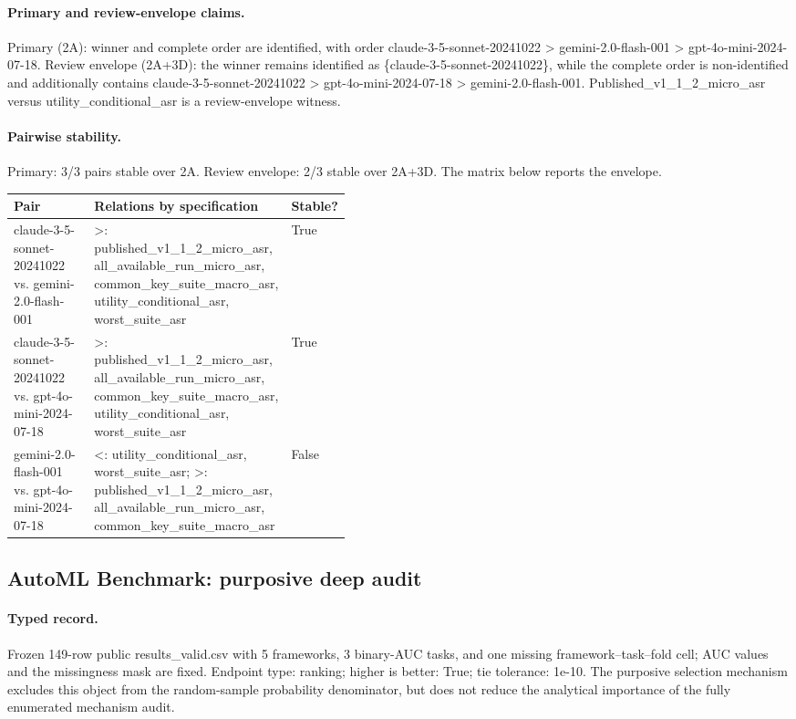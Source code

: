 \paragraph{Primary and review-envelope claims.} Primary (2A): winner and complete order are identified, with order claude-3-5-sonnet-20241022  >  gemini-2.0-flash-001  >  gpt-4o-mini-2024-07-18.  Review envelope (2A+3D): the winner remains identified as \{claude-3-5-sonnet-20241022\}, while the complete order is non-identified and additionally contains claude-3-5-sonnet-20241022  >  gpt-4o-mini-2024-07-18  >  gemini-2.0-flash-001.  Published\_v1\_1\_2\_micro\_asr versus utility\_conditional\_asr is a review-envelope witness.

\paragraph{Pairwise stability.} Primary: 3/3 pairs stable over 2A.  Review envelope: 2/3 stable over 2A+3D.  The matrix below reports the envelope.
\begingroup\scriptsize
\begin{tabularx}{\linewidth}{@{}p{0.34\linewidth}Xp{0.09\linewidth}@{}}
\toprule Pair & Relations by specification & Stable? \\
\midrule
claude-3-5-sonnet-20241022 vs. gemini-2.0-flash-001 & >: published\_v1\_1\_2\_micro\_asr, all\_available\_run\_micro\_asr, common\_key\_suite\_macro\_asr, utility\_conditional\_asr, worst\_suite\_asr & True \\
claude-3-5-sonnet-20241022 vs. gpt-4o-mini-2024-07-18 & >: published\_v1\_1\_2\_micro\_asr, all\_available\_run\_micro\_asr, common\_key\_suite\_macro\_asr, utility\_conditional\_asr, worst\_suite\_asr & True \\
gemini-2.0-flash-001 vs. gpt-4o-mini-2024-07-18 & <: utility\_conditional\_asr, worst\_suite\_asr; >: published\_v1\_1\_2\_micro\_asr, all\_available\_run\_micro\_asr, common\_key\_suite\_macro\_asr & False \\
\bottomrule\end{tabularx}\endgroup


\subsection{AutoML Benchmark: purposive deep audit}\label{app:r8-automlbenchmark-results-valid}

\paragraph{Typed record.} Frozen 149-row public results\_valid.csv with 5 frameworks, 3 binary-AUC tasks, and one missing framework--task--fold cell; AUC values and the missingness mask are fixed. Endpoint type: ranking; higher is better: True; tie tolerance: 1e-10. The purposive selection mechanism excludes this object from the random-sample probability denominator, but does not reduce the analytical importance of the fully enumerated mechanism audit.

